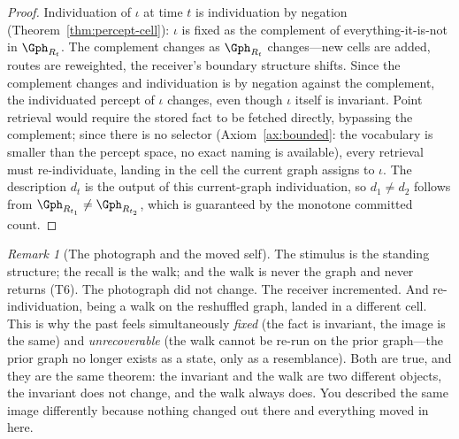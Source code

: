 \documentclass[twocolumn,11pt,a4paper]{article}
\theoremstyle{adv}
\theoremstyle{definition}
\theoremstyle{remark}
\newtheorem{remark}[theorem]{Remark}
\newcommand{\Recv}{R}                  %
\begin{document}
\begin{proof}
Individuation of $\iota$ at time $t$ is individuation by negation
(Theorem~\ref{thm:percept-cell}): $\iota$ is fixed as the complement of
everything-it-is-not in $\Gph_{\Recv_t}$. The complement changes as
$\Gph_{\Recv_t}$ changes---new cells are added, routes are reweighted, the
receiver's boundary structure shifts. Since the complement changes and
individuation is by negation against the complement, the individuated
percept of $\iota$ changes, even though $\iota$ itself is invariant. Point
retrieval would require the stored fact to be fetched directly, bypassing the
complement; since there is no selector (Axiom~\ref{ax:bounded}: the
vocabulary is smaller than the percept space, no exact naming is available),
every retrieval must re-individuate, landing in the cell the current graph
assigns to $\iota$. The description $d_t$ is the output of this current-graph
individuation, so $d_1 \neq d_2$ follows from $\Gph_{\Recv_{t_1}} \neq
\Gph_{\Recv_{t_2}}$, which is guaranteed by the monotone committed count.
\end{proof}

\begin{remark}[The photograph and the moved self]
The stimulus is the standing structure; the recall is the walk; and the walk
is never the graph and never returns (T6). The photograph did not change. The
receiver incremented. And re-individuation, being a walk on the reshuffled
graph, landed in a different cell. This is why the past feels simultaneously
\emph{fixed} (the fact is invariant, the image is the same) and
\emph{unrecoverable} (the walk cannot be re-run on the prior graph---the
prior graph no longer exists as a state, only as a resemblance). Both are
true, and they are the same theorem: the invariant and the walk are two
different objects, the invariant does not change, and the walk always does.
You described the same image differently because nothing changed out there
and everything moved in here.
\end{remark}
\end{document}

